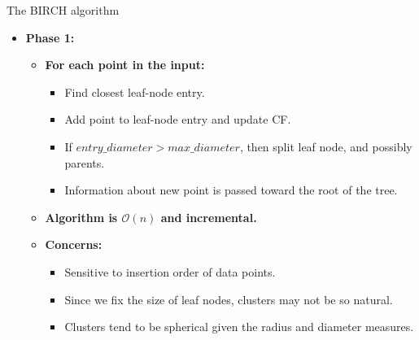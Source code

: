 \documentclass[aspectratio=169,t,xcolor=dvipsnames]{beamer}
\begin{document}
  { %
    \begin{frame}{The BIRCH algorithm}
      \begin{itemize}
        \item \textbf{Phase 1:}
        \begin{itemize}
          \item \textbf{For each point in the input:}
          \begin{itemize}
            \item Find closest leaf-node entry.
            \item Add point to leaf-node entry and update CF.
            \item If $entry\_diameter > max\_diameter$, then split leaf node, and possibly parents.
            \item Information about new point is passed toward the root of the tree.
          \end{itemize}
          \item \textbf{Algorithm is $\mathcal{O}(n)$ and incremental.}
          \item \textbf{Concerns:}
          \begin{itemize}
            \item Sensitive to insertion order of data points.
            \item Since we fix the size of leaf nodes, clusters may not be so natural.
            \item Clusters tend to be spherical given the radius and diameter measures.
          \end{itemize}
        \end{itemize}
      \end{itemize}
    \end{frame}
  }
\end{document}
